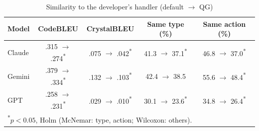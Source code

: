 \begin{table}[t]
  \centering
  \scriptsize
  \setlength{\tabcolsep}{2.5pt}
  \caption{Similarity to the developer's handler (default $\rightarrow$ QG)}
  \label{tab:rq3}
  \begin{tabular}{lcccc}
    \toprule
    Model & CodeBLEU & CrystalBLEU & Same type (\%) & Same action (\%) \\
    \midrule
    Claude & .315 $\rightarrow$ .274\textsuperscript{*} & .075 $\rightarrow$ .042\textsuperscript{*} & 41.3 $\rightarrow$ 37.1\textsuperscript{*} & 46.8 $\rightarrow$ 37.0\textsuperscript{*} \\
    Gemini & .379 $\rightarrow$ .334\textsuperscript{*} & .132 $\rightarrow$ .103\textsuperscript{*} & 42.4 $\rightarrow$ 38.5 & 55.6 $\rightarrow$ 48.4\textsuperscript{*} \\
    GPT & .258 $\rightarrow$ .231\textsuperscript{*} & .029 $\rightarrow$ .010\textsuperscript{*} & 30.1 $\rightarrow$ 23.6\textsuperscript{*} & 34.8 $\rightarrow$ 26.4\textsuperscript{*} \\
    \bottomrule
    \multicolumn{5}{l}{\textsuperscript{*}$p<0.05$, Holm (McNemar: type, action; Wilcoxon: others).}
  \end{tabular}
\end{table}
